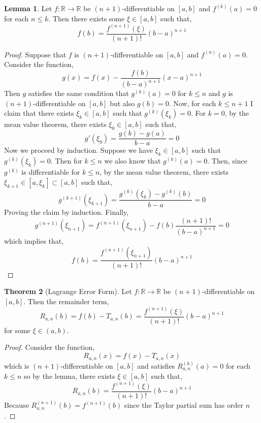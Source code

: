 \documentclass[12pt]{extarticle}
\newcommand{\R}{\mathbb{R}}
\theoremstyle{definition}
\newtheorem{theorem}{Theorem}[section]
\newtheorem{lemma}[theorem]{Lemma}
\begin{document}
\begin{lemma}
Let $f : \R \to \R$ be $(n+1)$-differentiable on $[a, b]$ and $f^{(k)}(a) = 0$ for each $n \le k$. Then there exists some $\xi \in [a,b]$ such that,
\[ f(b) = \frac{f^{(n+1)}(\xi)}{(n+1)!} (b - a)^{n + 1} \] 
\end{lemma}

\begin{proof}
Suppose that $f$ is $(n+1)$-differentiable on $[a,b]$ and $f^{(n)}(a) = 0$. Consider the function,
\[ g(x) = f(x) - \frac{f(b)}{(b - a)^{n+1}} (x - a)^{n+1} \]
Then $g$ satisfies the same condition that $g^{(k)}(a) = 0$ for $k \le n$ and $g$ is $(n+1)$-differentiable on $[a,b]$ but also $g(b) = 0$. Now, for each $k \le n + 1$ I claim that there exists $\xi_k \in [a, b]$ such that $g^{(k)}(\xi_k) = 0$. For $k = 0$, by the mean value theorem, there exists $\xi_0 \in [a, b]$ such that,
\[ g'(\xi_0) = \frac{g(b) - g(a)}{b - a} = 0 \]
Now we proceed by induction. Suppose we have $\xi_k \in [a,b]$ such that $g^{(k)}(\xi_k) = 0$. Then for $k \le n$ we also know that $g^{(k)}(a) = 0$. Then, since $g^{(k)}$ is differentiable for $k \le n$, by the mean value theorem, there exists $\xi_{k + 1} \in [a, \xi_k] \subset [a, b]$ such that,
\[ g^{(k+1)}(\xi_{k+1}) = \frac{g^{(k)}(\xi_k) - g^{(k)}(b)}{b - a} = 0 \]
Proving the claim by induction. Finally,
\[ g^{(n+1)}(\xi_{n+1}) = f^{(n+1)}(\xi_{n+1}) - f(b) \frac{(n+1)!}{(b - a)^{n+1}}  = 0 \] 
which implies that,
\[ f(b) = \frac{f^{(n+1)}(\xi_{n+1})}{(n+1)!} (b - a)^{n+1} \]
\end{proof}

\begin{theorem}[Lagrange Error Form]
Let $f : \R \to \R$ be $(n+1)$-differentiable on $[a, b]$. Then the remainder term,
\[ R_{a,n}(b) = f(b) - T_{a,n}(b) = \frac{f^{(n+1)}(\xi)}{(n + 1)!} (b - a)^{n + 1} \]
for some $\xi \in (a, b)$. 
\end{theorem}

\begin{proof}
Consider the function,
\[ R_{a,n}(x) = f(x) - T_{a,n}(x) \]
which is $(n+1)$-differentiable on $[a,b]$ and satisfies $R^{(k)}_{a,n}(a) = 0$ for each $k \le n$ so by the lemma, there exists $\xi \in [a,b]$ such that,
\[ R_{a,n}(b) = \frac{f^{(n+1)}(\xi)}{(n + 1)!} (b - a)^{n + 1}  \]
Because $R_{a,n}^{(n+1)}(b) = f^{(n+1)}(b)$ since the Taylor partial sum has order $n$.
\end{proof}
\end{document}
